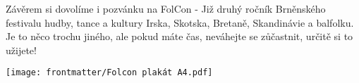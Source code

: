 Závěrem si dovolíme i pozvánku na FolCon - Již druhý ročník Brněnského festivalu hudby, tance a kultury Irska, Skotska, Bretaně, Skandinávie a balfolku. Je to něco trochu jiného, ale pokud máte čas, neváhejte se zůčastnit, určitě si to užijete!
\clearpage
\begin{center}
\texttt{[image: frontmatter/Folcon plakát A4.pdf]}
\end{center}


\cleardoublepage   %